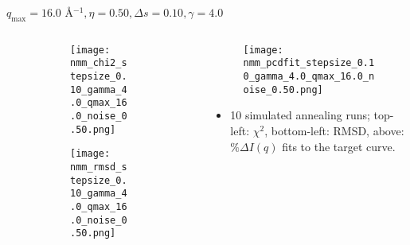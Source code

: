 \documentclass{beamer}
\begin{document}
\begin{frame}{$ q_{\textrm{max}}=16.0 $ \AA $^{-1}, \eta=0.50, \Delta s=0.10, \gamma=4.0$}
	\begin{columns}
		\begin{column}{.5\textwidth}
			\begin{figure}[H]
			\centering
			\begin{subfigure}[b]{\textwidth}
				\centering
				\texttt{[image: nmm\_chi2\_stepsize\_0.10\_gamma\_4.0\_qmax\_16.0\_noise\_0.50.png]}
				\label{fig:}
			\end{subfigure}
			\begin{subfigure}[b]{\textwidth}
				\centering
				\texttt{[image: nmm\_rmsd\_stepsize\_0.10\_gamma\_4.0\_qmax\_16.0\_noise\_0.50.png]}
				\label{fig:}
			\end{subfigure}
			\end{figure}
		\end{column}
		\begin{column}{.5\textwidth}
			\begin{figure}[H]
				\centering
				\texttt{[image: nmm\_pcdfit\_stepsize\_0.10\_gamma\_4.0\_qmax\_16.0\_noise\_0.50.png]}
				\label{fig:}
			\end{figure}
			\begin{itemize}
				\item 10 simulated annealing runs; top-left: $\chi^2$, bottom-left: RMSD, above: $\%\Delta I(q)$ fits to the target curve.
			\end{itemize}
		\end{column}
	\end{columns}
\end{frame}
 
\end{document}
